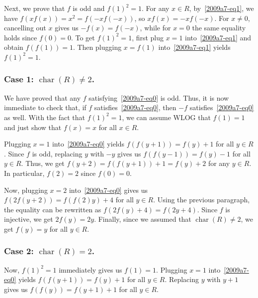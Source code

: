 \documentclass{article}
\DeclareMathOperator{\rchar}{char}
\begin{document}
Next, we prove that $f$ is odd and $f(1)^2 = 1$.
For any $x \in R$, by~\eqref{2009a7-eq1}, we have $f(x f(x)) = x^2 = f(-x f(-x))$, so $x f(x) = -x f(-x)$.
For $x \neq 0$, cancelling out $x$ gives us $-f(x) = f(-x)$, while for $x = 0$ the same equality holds since $f(0) = 0$.
To get $f(1)^2 = 1$, first plug $x = 1$ into~\eqref{2009a7-eq1} and obtain $f(f(1)) = 1$.
Then plugging $x = f(1)$ into~\eqref{2009a7-eq1} yields $f(1)^2 = 1$.


\subsubsection*{Case 1: $\rchar(R) \neq 2$.}

We have proved that any $f$ satisfying~\eqref{2009a7-eq0} is odd.
Thus, it is now immediate to check that, if $f$ satisfies~\eqref{2009a7-eq0}, then $-f$ satisfies~\eqref{2009a7-eq0} as well.
With the fact that $f(1)^2 = 1$, we can assume WLOG that $f(1) = 1$ and just show that $f(x) = x$ for all $x \in R$.

Plugging $x = 1$ into~\eqref{2009a7-eq0} yields $f(f(y + 1)) = f(y) + 1$ for all $y \in R$.
Since $f$ is odd, replacing $y$ with $-y$ gives us $f(f(y - 1)) = f(y) - 1$ for all $y \in R$.
Thus, we get $f(y + 2) = f(f(y + 1)) + 1 = f(y) + 2$ for any $y \in R$.
In particular, $f(2) = 2$ since $f(0) = 0$.

Now, plugging $x = 2$ into~\eqref{2009a7-eq0} gives us $f(2 f(y + 2)) = f(f(2) y) + 4$ for all $y \in R$.
Using the previous paragraph, the equality can be rewritten as $f(2 f(y) + 4) = f(2y + 4)$.
Since $f$ is injective, we get $2 f(y) = 2y$.
Finally, since we assumed that $\rchar(R) \neq 2$, we get $f(y) = y$ for all $y \in R$.


\subsubsection*{Case 2: $\rchar(R) = 2$.}

Now, $f(1)^2 = 1$ immediately gives us $f(1) = 1$.
Plugging $x = 1$ into~\eqref{2009a7-eq0} yields $f(f(y + 1)) = f(y) + 1$ for all $y \in R$.
Replacing $y$ with $y + 1$ gives us $f(f(y)) = f(y + 1) + 1$ for all $y \in R$.
\end{document}
